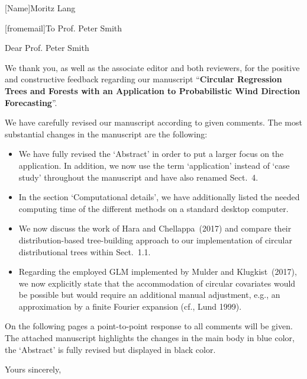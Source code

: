 \documentclass[english, noconfig]{uibklttr}
\begin{document}

[Name]{Moritz Lang}





\begin{letter}[fromemail]{To Prof. Peter Smith}
\opening{Dear Prof. Peter Smith}

We thank you, as well as the associate editor and both reviewers, for the
positive and constructive feedback regarding our manuscript ``\textbf{Circular
Regression Trees and Forests with an Application to Probabilistic Wind
Direction Forecasting}''.

\vspace{5mm}

We have carefully revised our manuscript according to given comments.
The most substantial changes in the manuscript are the following:

\begin{itemize}
\item We have fully revised the `Abstract' in order to put a larger
focus on the application. In addition, we now use the term `application' 
instead of `case study' throughout the manuscript and have also renamed Sect.~4.
 
\item In the section `Computational details', we have additionally listed the needed
computing time of the different methods on a standard desktop computer. 

\item We now discuss the work of Hara and Chellappa~(2017) and compare their distribution-based 
tree-building approach to our implementation of circular distributional trees within Sect.~1.1.

\item Regarding the employed GLM implemented by Mulder and Klugkist~(2017), we now
explicitly state that the accommodation of circular covariates would be possible
but would require an additional manual adjustment, e.g., an approximation by a finite
Fourier expansion (cf., Lund 1999).

\end{itemize}

\vspace{5mm}

On the following pages a point-to-point response to all comments will be given.
The attached manuscript highlights the changes in the main body in blue color,
the `Abstract' is fully revised but displayed in black color.

\closing{Yours sincerely,}

\end{letter}
\end{document}
